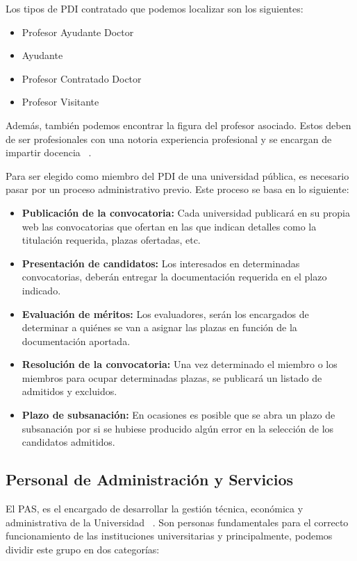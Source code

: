 Los tipos de PDI contratado que podemos localizar son los siguientes:

\begin{itemize}
    \item Profesor Ayudante Doctor
    \item Ayudante
    \item Profesor Contratado Doctor
    \item Profesor Visitante
\end{itemize}

Además, también podemos encontrar la figura del profesor asociado. Estos deben de ser profesionales con una  notoria experiencia profesional y se encargan de impartir docencia ~\cite{pdi:latex}. 

Para ser elegido como miembro del PDI de una universidad pública, es necesario pasar por un proceso administrativo previo. Este proceso se basa en lo siguiente:

\begin{itemize}
    \item \textbf{Publicación de la convocatoria:} Cada universidad publicará en su propia web las convocatorias que ofertan en las que indican detalles como la titulación requerida, plazas ofertadas, etc.
    \item \textbf{Presentación de candidatos:} Los interesados en determinadas convocatorias, deberán entregar la documentación requerida en el plazo indicado.
    \item \textbf{Evaluación de méritos:} Los evaluadores, serán los encargados de determinar a quiénes se van a asignar las plazas en función de la documentación aportada.
    \item \textbf{Resolución de la convocatoria:} Una vez determinado el miembro o los miembros para ocupar determinadas plazas, se publicará un listado de admitidos y excluidos.
    \item \textbf{Plazo de subsanación:} En ocasiones es posible que se abra un plazo de subsanación por si se hubiese producido algún error en la selección de los candidatos admitidos.
\end{itemize}


\subsection{Personal de Administración y Servicios}

El PAS, es el encargado de desarrollar la gestión técnica, económica y administrativa de la Universidad ~\cite{raepas:latex}. Son personas fundamentales para el correcto funcionamiento de las instituciones universitarias y principalmente, podemos dividir este grupo en dos categorías:

